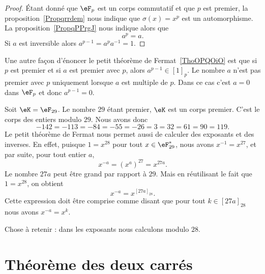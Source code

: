 \begin{proof}
    Étant donné que \( \eF_p\) est un corps commutatif et que \( p\) est premier, la proposition~\ref{Propqrrdem} nous indique que \( \sigma(x)=x^p\) est un automorphisme. La proposition~\ref{PropqPPrgJ} nous indique alors que
    \begin{equation}
        a^p=a.
    \end{equation}
    Si \( a\) est inversible alors \( a^{p-1}=a^pa^{-1}=1\).
\end{proof}

\begin{remark}      \label{RemCoSnxh}
    Une autre façon d'énoncer le petit théorème de Fermat~\ref{ThoOPQOiO} est que si \( p\) est premier et si \( a\) est premier avec \( p\), alors \( a^{p-1}\in[1]_p\). Le nombre \( a\) n'est pas premier avec \( p\) uniquement lorsque \( a\) est multiple de \( p\). Dans ce cas c'est \( a=0\) dans \( \eF_p\) et donc \( a^{p-1}=0\).
\end{remark}

\begin{example}
    Soit \( \eK=\eF_{29}\). Le nombre \( 29\) étant premier, \( \eK\) est un corps premier. C'est le corps des entiers modulo \( 29\). Nous avons donc
    \begin{equation}
            -142=-113=-84=-55=-26=3=32=61=90=119.
    \end{equation}
    Le petit théorème de Fermat nous permet aussi de calculer des exposants et des inverses. En effet, puisque \( 1=x^{28}\) pour tout \( x \in \eF_{29}^* \), nous avons \( x^{-1}=x^{27}\), et par suite, pour tout entier \( a \),
    \begin{equation}
        x^{-a}=(x^a)^{27}=x^{27a}.
    \end{equation}
    Le nombre \( 27 a\) peut être grand par rapport à \( 29\). Mais en réutilisant le fait que \( 1=x^{28}\), on obtient
    \begin{equation}
        x^{-a}=x^{[27a]_{28}}.
    \end{equation}
    Cette expression doit être comprise comme disant que pour tout \( k\in [27a]_{28}\) nous avons \( x^{-a}=x^{k}\).

    Chose à retenir : dans les exposants nous calculons modulo \( 28\).
\end{example}

\section{Théorème des deux carrés}

